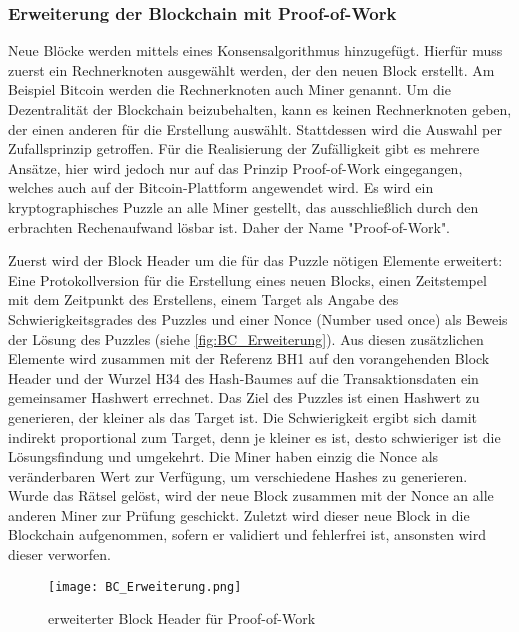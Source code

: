 \subsubsection{Erweiterung der Blockchain mit Proof-of-Work}
\label{sec:Erweiterung}
Neue Blöcke werden mittels eines Konsensalgorithmus hinzugefügt.
Hierfür muss zuerst ein Rechnerknoten ausgewählt werden, der den neuen Block erstellt. 
Am Beispiel Bitcoin werden die Rechnerknoten auch \glqq Miner\grqq{} genannt.
Um die Dezentralität der Blockchain beizubehalten, kann es keinen Rechnerknoten geben, der einen 
anderen für die Erstellung auswählt. Stattdessen wird die Auswahl per Zufallsprinzip getroffen.
Für die Realisierung der Zufälligkeit gibt es mehrere Ansätze, hier wird jedoch nur auf das
Prinzip \glqq Proof-of-Work\grqq{} eingegangen, welches auch auf der Bitcoin-Plattform angewendet wird.
Es wird ein kryptographisches Puzzle an alle Miner gestellt, das ausschließlich
durch den erbrachten Rechenaufwand lösbar ist. Daher der Name "Proof-of-Work". 

Zuerst wird der Block Header um die für das Puzzle nötigen Elemente 
erweitert: Eine Protokollversion für die Erstellung eines neuen Blocks, einen Zeitstempel mit
dem Zeitpunkt des Erstellens, einem Target als Angabe des Schwierigkeitsgrades des Puzzles
und einer Nonce (Number used once) als Beweis der Lösung des Puzzles (siehe \autoref{fig:BC_Erweiterung}).
Aus diesen zusätzlichen Elemente wird zusammen mit der Referenz BH1 auf den vorangehenden 
Block Header und der Wurzel H34 des Hash-Baumes auf die Transaktionsdaten ein gemeinsamer 
Hashwert errechnet. 
Das Ziel des Puzzles ist einen Hashwert zu generieren, der kleiner als das Target ist. Die 
Schwierigkeit ergibt sich damit indirekt proportional zum Target, denn je kleiner es ist, desto
schwieriger ist die Lösungsfindung und umgekehrt.
Die Miner haben einzig die Nonce als veränderbaren Wert zur Verfügung, um verschiedene Hashes zu generieren. 
Wurde das Rätsel gelöst, wird der neue Block zusammen mit der Nonce an alle anderen Miner zur Prüfung
geschickt.
Zuletzt wird dieser neue Block in die Blockchain aufgenommen, sofern er validiert und 
fehlerfrei ist, ansonsten wird dieser verworfen.
\cite[p.~22ff]{fill2020blockchain}


    
\begin{figure}[h]
    \begin{center}
        \texttt{[image: BC\_Erweiterung.png]}
    \end{center}
    \caption{erweiterter Block Header für Proof-of-Work}
    \label{fig:BC_Erweiterung}
\end{figure}


